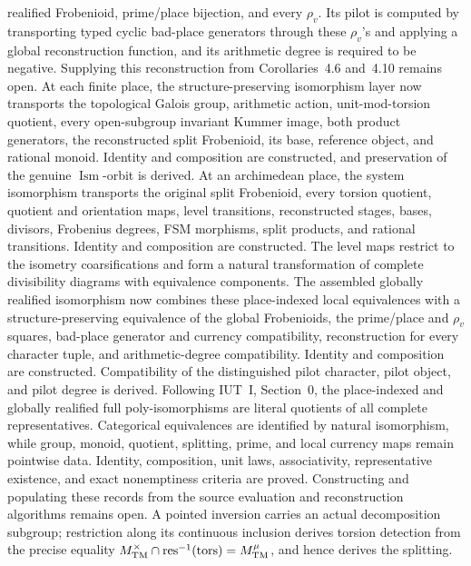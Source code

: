 \begin{definition}
  realified Frobenioid, prime/place bijection, and every \(\rho_v\).  Its pilot
  is computed by transporting typed cyclic bad-place generators through these
  \(\rho_v\)'s and applying a global reconstruction function, and its
  arithmetic degree is required to be negative.  Supplying this reconstruction
  from Corollaries~4.6 and~4.10 remains open.  At each finite place, the
  structure-preserving isomorphism layer now transports the topological Galois
  group, arithmetic action, unit-mod-torsion quotient, every open-subgroup
  invariant Kummer image, both product generators, the reconstructed split
  Frobenioid, its base, reference object, and rational monoid.  Identity and
  composition are constructed, and preservation of the genuine
  \(\operatorname{Ism}\)-orbit is derived.  At an archimedean place, the
  system isomorphism transports the original split Frobenioid, every torsion
  quotient, quotient and orientation maps, level transitions, reconstructed
  stages, bases, divisors, Frobenius degrees, FSM morphisms, split products,
  and rational transitions.  Identity and composition are constructed.  The
  level maps restrict to the isometry coarsifications and form a natural
  transformation of complete divisibility diagrams with equivalence
  components.  The assembled globally realified isomorphism now combines
  these place-indexed local equivalences with a
  structure-preserving equivalence of the global Frobenioids, the prime/place
  and \(\rho_v\) squares, bad-place generator and currency compatibility,
  reconstruction for every character tuple, and arithmetic-degree
  compatibility.  Identity and composition are constructed.  Compatibility
  of the distinguished pilot character, pilot object, and pilot degree is
  derived.  Following IUT~I, Section~0, the place-indexed and globally
  realified full poly-isomorphisms are literal quotients of all complete
  representatives.  Categorical equivalences are identified by natural
  isomorphism, while group, monoid, quotient, splitting, prime, and local
  currency maps remain pointwise data.  Identity, composition, unit laws,
  associativity, representative existence, and exact nonemptiness criteria
  are proved.  Constructing and populating these records from the source
  evaluation and reconstruction algorithms remains open.
  A pointed inversion carries an
  actual decomposition subgroup; restriction along its continuous inclusion
  derives torsion detection from the precise equality
  \(M_{\rm TM}^{\times}\cap\operatorname{res}^{-1}(\mathrm{tors})=
  M_{\rm TM}^{\mu}\), and hence derives the splitting.

\end{definition}
